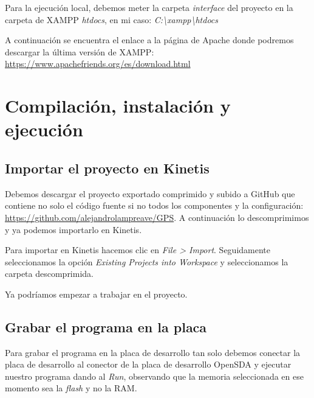 

Para la ejecución local, debemos meter la carpeta \textit{interface} del proyecto en la carpeta de XAMPP \textit{htdocs}, en mi caso: \textit{C:\textbackslash{}xampp\textbackslash{}htdocs}
 
A continuación se encuentra el enlace a la página de Apache donde podremos descargar la última versión de XAMPP:
\url{https://www.apachefriends.org/es/download.html}

\section{Compilación, instalación y ejecución}

\subsection{Importar el proyecto en Kinetis}
Debemos descargar el proyecto exportado comprimido y subido a GitHub que contiene no solo el código fuente si no todos los componentes y la configuración: \url{https://github.com/alejandrolampreave/GPS}.
A continuación lo descomprimimos y ya podemos importarlo en Kinetis.

Para importar en Kinetis hacemos clic en \textit{File > Import}. Seguidamente seleccionamos la opción \textit{Existing Projects into Workspace} y seleccionamos la carpeta descomprimida. 


Ya podríamos empezar a trabajar en el proyecto.

\subsection{Grabar el programa en la placa}
Para grabar el programa en la placa de desarrollo tan solo debemos conectar la placa de desarrollo al conector de la placa de desarrollo OpenSDA y ejecutar nuestro programa dando al \textit{Run}, observando que la memoria seleccionada en ese momento sea la \textit{flash} y no la RAM.

